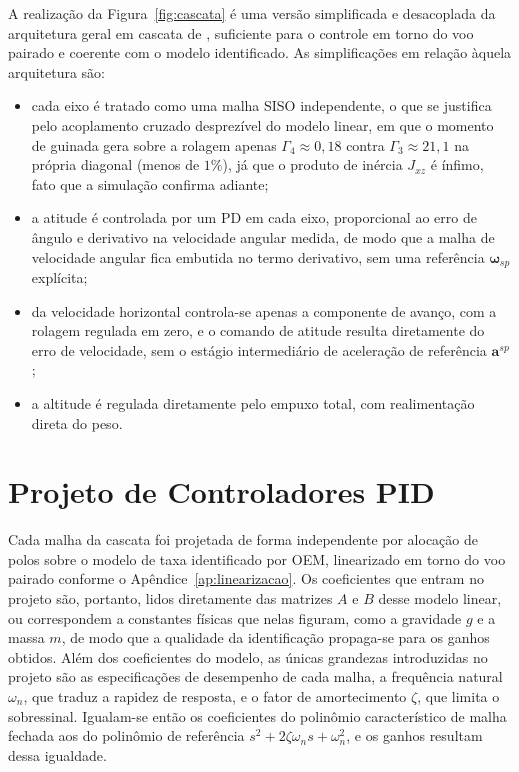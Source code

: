 {\color{blue}A realização da Figura~\ref{fig:cascata} é uma versão simplificada e desacoplada da arquitetura geral em cascata de \textcite{Hu2024}, suficiente para o controle em torno do voo pairado e coerente com o modelo identificado. As simplificações em relação àquela arquitetura são:}
\begin{itemize}
    \item cada eixo é tratado como uma malha SISO independente, o que se justifica pelo acoplamento cruzado desprezível do modelo linear, em que o momento de guinada gera sobre a rolagem apenas {\color{blue}$\Gamma_4\approx0{,}18$ contra $\Gamma_3\approx21{,}1$ na própria diagonal (menos de $1\%$)}, já que o produto de inércia $J_{xz}$ é ínfimo, fato que a simulação confirma adiante;
    \item a atitude é controlada por um PD em cada eixo, proporcional ao erro de ângulo e derivativo na velocidade angular medida, de modo que a malha de velocidade angular fica embutida no termo derivativo, sem uma referência $\boldsymbol{\omega}_{sp}$ explícita;
    \item da velocidade horizontal controla-se apenas a componente de avanço, com a rolagem regulada em zero, e o comando de atitude resulta diretamente do erro de velocidade, sem o estágio intermediário de aceleração de referência $\mathbf{a}^{sp}$;
    \item a altitude é regulada diretamente pelo empuxo total, com realimentação direta do peso.
\end{itemize}

\section{Projeto de Controladores PID}

Cada malha da cascata foi projetada de forma independente por alocação de polos sobre o modelo de taxa identificado por OEM, linearizado em torno do voo pairado conforme o Apêndice~\ref{ap:linearizacao}. Os coeficientes que entram no projeto são, portanto, lidos diretamente das matrizes $A$ e $B$ desse modelo linear, ou correspondem a constantes físicas que nelas figuram, como a gravidade $g$ e a massa $m$, de modo que a qualidade da identificação propaga-se para os ganhos obtidos. {\color{blue}Além dos coeficientes do modelo, as únicas grandezas introduzidas no projeto são as especificações de desempenho de cada malha, a frequência natural $\omega_n$, que traduz a rapidez de resposta, e o fator de amortecimento $\zeta$, que limita o sobressinal. Igualam-se então os coeficientes do polinômio característico de malha fechada aos do polinômio de referência $s^2+2\zeta\omega_n s+\omega_n^2$, e os ganhos resultam dessa igualdade.}

